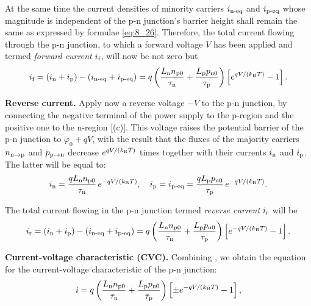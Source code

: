 At the same time the current densities of minority carriers $i_{\text{n-eq}}$ and $i_{\text{p-eq}}$ whose magnitude is independent of the p-n junction's barrier height shall remain the same as expressed by formulae \eqref{eq:8_26}. Therefore, the total current flowing through the p-n junction, to which a forward voltage $V$ has been applied and termed \textit{forward current} $i_{\text{f}}$, will now be not zero but
\begin{equation}\label{eq:8_27}
	i_{\text{f}} = (i_{\text{n}} + i_{\text{p}}) - (i_{\text{n-eq}} + i_{\text{p-eq}}) = q \left( \frac{L_{\text{n}} n_{\text{p$0$}}}{\tau_{\text{n}}} + \frac{L_{\text{p}} p_{\text{n$0$}}}{\tau_{\text{p}}} \right) \left[e^{qV/(k_{\text{B}}T)} - 1\right].
\end{equation}

\textbf{Reverse current.} Apply now a reverse voltage $-V$ to the p-n junction, by connecting the negative terminal of the power supply to the p-region and the positive one to the n-region [(c)]. This voltage raises the potential barrier of the p-n junction to $\varphi_0+qV$, with the result that the fluxes of the majority carriers $n_{\text{n$\to$p}}$  and $p_{\text{p$\to$n}}$ decrease $e^{qV/(k_{\text{B}}T)}$ times together with their currents $i_{\text{n}}$ and $i_{\text{p}}$. The latter will be equal to:
\begin{equation*}
	i_{\text{n}} = \frac{q L_{\text{n}} n_{\text{p$0$}}}{\tau_{\text{n}}}\, e^{-qV/(k_{\text{B}}T)},\quad i_{\text{p}} = i_{\text{p-eq}} = \frac{q L_{\text{p}} p_{\text{n$0$}}}{\tau_{\text{p}}}\, e^{-qV/(k_{\text{B}}T)}.
\end{equation*}

The total current flowing in the p-n junction termed \textit{reverse current} $i_{\text{r}}$ will be
\begin{equation}\label{eq:8_28}
	i_{\text{r}} = (i_{\text{n}} + i_{\text{p}}) - (i_{\text{n-eq}} + i_{\text{p-eq}}) = q \left( \frac{L_{\text{n}} n_{\text{p$0$}}}{\tau_{\text{n}}} + \frac{L_{\text{p}} p_{\text{n$0$}}}{\tau_{\text{p}}} \right) \left[e^{-qV/(k_{\text{B}}T)} - 1\right].
\end{equation}

\textbf{Current-voltage characteristic (CVC).} Combining , we obtain the equation for the current-voltage characteristic of the p-n junction:
\begin{equation}\label{eq:8_29}
	i = q \left( \frac{L_{\text{n}} n_{\text{p$0$}}}{\tau_{\text{n}}} + \frac{L_{\text{p}} p_{\text{n$0$}}}{\tau_{\text{p}}} \right) \left[\pm e^{-qV/(k_{\text{B}}T)} - 1\right],
\end{equation}

